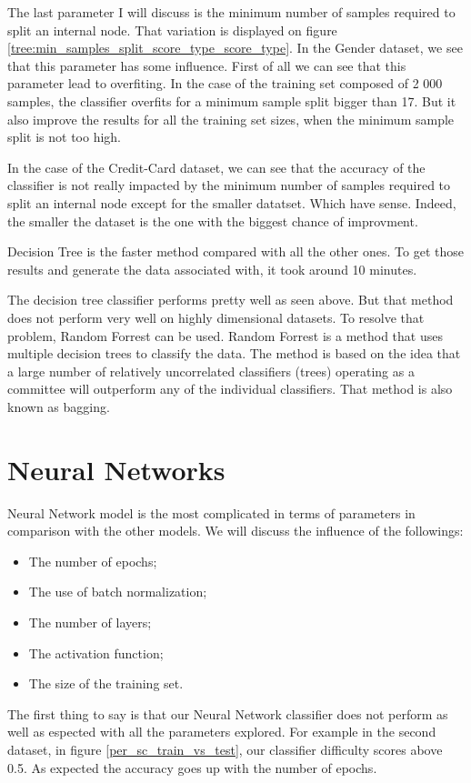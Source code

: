 \documentclass[10pt]{article}
\begin{document}
		The last parameter I will discuss is the minimum number of samples required to split an internal node. That variation is displayed on figure \ref{tree:min_samples_split_score_type_score_type}.
		In the Gender dataset, we see that this parameter has some influence. First of all we can see that this parameter lead to overfiting. In the case of the training set composed of 2 000 samples, the classifier overfits for a minimum sample split bigger than 17. But it also improve the results for all the training set sizes, when the minimum sample split is not too high.

		In the case of the Credit-Card dataset, we can see that the accuracy of the classifier is not really impacted by the minimum number of samples required to split an internal node except for the smaller datatset. Which have sense. Indeed, the smaller the dataset is the one with the biggest chance of improvment.

		Decision Tree is the faster method compared with all the other ones. To get those results and generate the data associated with, it took around 10 minutes.

		The decision tree classifier performs pretty well as seen above. But that method does not perform very well on highly dimensional datasets. To resolve that problem, Random Forrest can be used. Random Forrest is a method that uses multiple decision trees to classify the data. The method is based on the idea that a large number of relatively uncorrelated classifiers (trees) operating as a committee will outperform any of the individual classifiers. That method is also known as bagging.
	\section{Neural Networks}
		Neural Network model is the most complicated in terms of parameters in comparison with the other models. We will discuss the influence of the followings:
		\begin{itemize}
			\item The number of epochs;
			\item The use of batch normalization;
			\item The number of layers;
			\item The activation function;
			\item The size of the training set.
		\end{itemize}

		The first thing to say is that our Neural Network classifier does not perform as well as espected with all the parameters explored. For example in the second dataset, in figure \ref{per_sc_train_vs_test}, our classifier difficulty scores above 0.5. As expected the accuracy goes up with the number of epochs.
\end{document}
